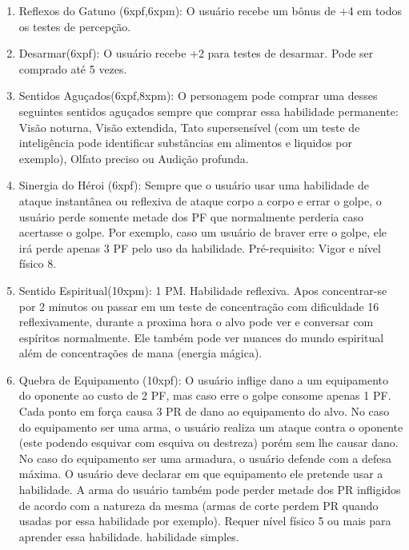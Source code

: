 \begin{enumerate}
	\item Reflexos do Gatuno (6xpf,6xpm): O usuário recebe um bônus de +4 em todos os testes de percepção.

 	\item Desarmar(6xpf): O usuário recebe +2 para testes de desarmar. Pode ser comprado até 5 vezes.

	\item Sentidos Aguçados(6xpf,8xpm): O personagem pode comprar uma desses seguintes sentidos aguçados sempre que comprar essa habilidade permanente: Visão noturna, Visão extendida, Tato supersensível (com um teste de inteligência pode identificar substâncias em alimentos e liquidos por exemplo), Olfato preciso ou Audição profunda.

	\item Sinergia do Héroi (6xpf): Sempre que o usuário usar uma habilidade de ataque instantânea ou reflexiva de ataque corpo a corpo e errar o golpe, o usuário perde somente metade dos PF que normalmente perderia caso acertasse o golpe. Por exemplo, caso um usuário de braver erre o golpe, ele irá perde apenas 3 PF pelo uso da habilidade. Pré-requisito: Vigor e nível físico 8.

	\item Sentido Espiritual(10xpm): 1 PM. Habilidade reflexiva.\newline
Apos concentrar-se por 2 minutos ou passar em um teste de concentração com dificuldade 16 reflexivamente, durante a proxima hora o alvo pode ver e conversar com espíritos normalmente. Ele também pode ver nuances do mundo espiritual além de concentrações de mana (energia mágica). 

	\item Quebra de Equipamento (10xpf): O usuário inflige dano a um equipamento do oponente ao custo de 2 PF, mas caso erre o golpe consome apenas 1 PF. Cada ponto em força causa 3 PR de dano ao equipamento do alvo. No caso do equipamento ser uma arma, o usuário realiza um ataque contra o oponente (este podendo esquivar com esquiva ou destreza) porém sem lhe causar dano. No caso do equipamento ser uma armadura, o usuário defende com a defesa máxima. O usuário deve declarar em que equipamento ele pretende usar a habilidade.  A arma do usuário também pode perder metade dos PR infligidos de acordo com a natureza da mesma (armas de corte perdem PR quando usadas por essa habilidade por exemplo). Requer nível físico 5 ou mais para aprender essa habilidade. habilidade simples.

	

\end{enumerate}
